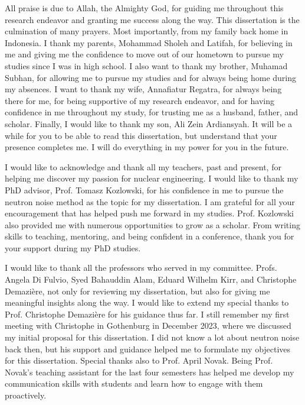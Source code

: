 \documentclass{uiucthesis2021}
\begin{document}
\begin{acknowledgments}

All praise is due to Allah, the Almighty God, for guiding me throughout this research endeavor and granting me success along the way. This dissertation is the culmination of many prayers. Most importantly, from my family back home in Indonesia. I thank my parents, Mohammad Sholeh and Latifah, for believing in me and giving me the confidence to move out of our hometown to pursue my studies since I was in high school. I also want to thank my brother, Muhamad Subhan, for allowing me to pursue my studies and for always being home during my absences. I want to thank my wife, Annafiatur Regatra, for always being there for me, for being supportive of my research endeavor, and for having confidence in me throughout my study, for trusting me as a husband, father, and scholar. Finally, I would like to thank my son, Ali Zein Ardiansyah. It will be a while for you to be able to read this dissertation, but understand that your presence completes me. I will do everything in my power for you in the future.

I would like to acknowledge and thank all my teachers, past and present, for helping me discover my passion for nuclear engineering. I would like to thank my PhD advisor, Prof. Tomasz Kozlowski, for his confidence in me to pursue the neutron noise method as the topic for my dissertation. I am grateful for all your encouragement that has helped push me forward in my studies. Prof. Kozlowski also provided me with numerous opportunities to grow as a scholar. From writing skills to teaching, mentoring, and being confident in a conference, thank you for your support during my PhD studies.

I would like to thank all the professors who served in my committee. Profs. Angela Di Fulvio, Syed Bahauddin Alam, Eduard Wilhelm Kirr, and Christophe Demazière, not only for reviewing my dissertation, but also for giving me meaningful insights along the way. I would like to extend my special thanks to Prof. Christophe Demazière for his guidance thus far. I still remember my first meeting with Christophe in Gothenburg in December 2023, where we discussed my initial proposal for this dissertation. I did not know a lot about neutron noise back then, but his support and guidance helped me to formulate my objectives for this dissertation. Special thanks also to Prof. April Novak. Being Prof. Novak's teaching assistant for the last four semesters has helped me develop my communication skills with students and learn how to engage with them proactively.


\end{acknowledgments}
\end{document}
